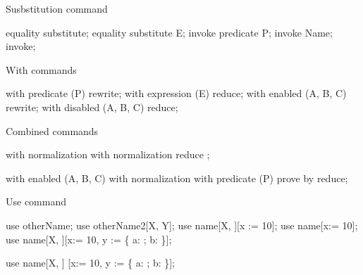 Susbstitution command

\begin{zproof}[substCmd]
equality substitute;
equality substitute E;
invoke predicate P;
invoke Name;
invoke;
\end{zproof}

With commands

\begin{zproof}[withCmds]
with predicate (P) rewrite;
with expression (E) reduce;
with enabled (A, B, C) rewrite;
with disabled (A, B, C) reduce;
\end{zproof}

Combined commands

\begin{zproof}[combinedCmd1]
with normalization
      with
          normalization
              reduce
      ;           %

with enabled (A, B, C)
  with normalization
    with predicate (P)
      prove by reduce;
\end{zproof}

Use command

\begin{zproof}[useCmd]
use otherName;
use otherName2[X, Y];
use name[X, \power \nat][x := 10];
use name[x:= 10];
use name[X, \power \nat][x:= 10,
  y := \{ a: \nat; b: \nat \}];

use name[X, \power \nat]
[x:= 10,
  y := \{ a: \nat; b: \nat \}];
\end{zproof}
